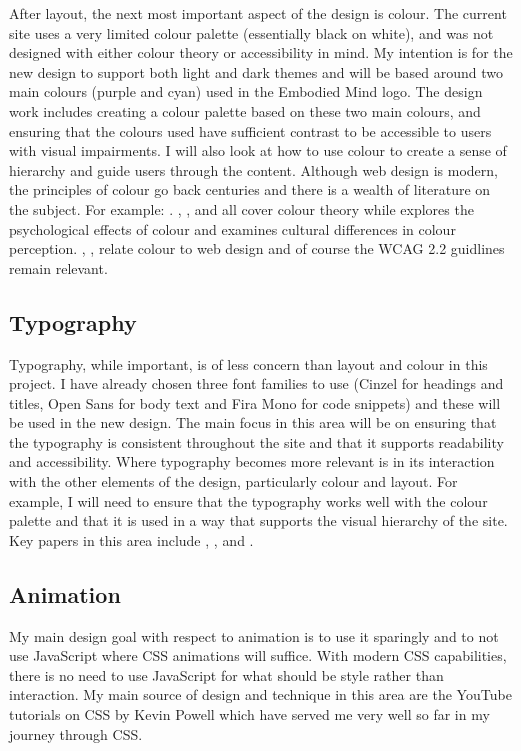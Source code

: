 \documentclass[a4paper, 12pt]{article}
\begin{document}
After layout, the next most important aspect of the design is colour. The current site uses a very limited colour palette (essentially black on white), and was not designed with either colour theory or accessibility in mind. My intention is for the new design to support both light and dark themes and will be based around two main colours (purple and cyan) used in the Embodied Mind logo. The design work includes creating a colour palette based on these two main colours, and ensuring that the colours used have sufficient contrast to be accessible to users with visual impairments. I will also look at how to use colour to create a sense of hierarchy and guide users through the content. Although web design is modern, the principles of colour go back centuries and there is a wealth of literature on the subject. For example: \cite{lupton2008}. \cite{chevreul1839principles}, \cite{goethe1810theory}, \cite{gage1993colour} and \cite{munsell1905color} all cover colour theory while \cite{elliot2007color} explores the psychological effects of colour and \cite{cyr2010colour} examines cultural differences in colour perception. \cite{noiwan2008color}, \cite{bonnardel2011impact}, \cite{hill2003colour} relate colour to web design and of course the WCAG 2.2 guidlines \citep{caldwell2024} remain relevant.

\subsection{Typography}

Typography, while important, is of less concern than layout and colour in this project. I have already chosen three font families to use (Cinzel for headings and titles, Open Sans for body text and Fira Mono for code snippets) and these will be used in the new design. The main focus in this area will be on ensuring that the typography is consistent throughout the site and that it supports readability and accessibility. Where typography becomes more relevant is in its interaction with the other elements of the design, particularly colour and layout. For example, I will need to ensure that the typography works well with the colour palette and that it is used in a way that supports the visual hierarchy of the site. Key papers in this area include \cite{lupton2008}, \cite{bringhurst2013elements}, \cite{garrett2010elements} and \cite{mccandless2012typography}.

\subsection{Animation}
My main design goal with respect to animation is to use it sparingly and to not use JavaScript where CSS animations will suffice. With modern CSS capabilities, there is no need to use JavaScript for what should be style rather than interaction. My main source of design and technique in this area are the YouTube tutorials on CSS by Kevin Powell \citep{powell_youtube} which have served me very well so far in my journey through CSS.
\end{document}
